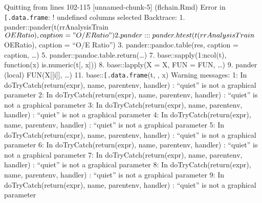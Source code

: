 \documentclass[
]{article}
\newenvironment{Shaded}{\begin{snugshade}}{\end{snugshade}}
\newcommand{\AttributeTok}[1]{\textcolor[rgb]{0.13,0.29,0.53}{#1}}
\newcommand{\FunctionTok}[1]{\textcolor[rgb]{0.13,0.29,0.53}{\textbf{#1}}}
\newcommand{\NormalTok}[1]{#1}
\newcommand{\SpecialCharTok}[1]{\textcolor[rgb]{0.81,0.36,0.00}{\textbf{#1}}}
\newcommand{\StringTok}[1]{\textcolor[rgb]{0.31,0.60,0.02}{#1}}
\begin{document}
Quitting from lines 102-115 {[}unnamed-chunk-5{]} (flchain.Rmd) Error in
\texttt{{[}.data.frame}: ! undefined columns selected Backtrace: 1.
pander::pander(t(rrAnalysisTrain\(OERatio), caption = "O/E Ratio")  2. pander:::pander.htest(t(rrAnalysisTrain\)OERatio),
caption = ``O/E Ratio'') 3. pander::pandoc.table(res, caption = caption,
\ldots) 5. pander::pandoc.table.return(\ldots) 7.
base::sapply(1:ncol(t), function(x) is.numeric(t{[}, x{]})) 8.
base::lapply(X = X, FUN = FUN, \ldots) 9. pander (local)
FUN(X{[}{[}i{]}{]}, \ldots) 11. base::\texttt{{[}.data.frame}(t, , x)
Warning messages: 1: In doTryCatch(return(expr), name, parentenv,
handler) : ``quiet'' is not a graphical parameter 2: In
doTryCatch(return(expr), name, parentenv, handler) : ``quiet'' is not a
graphical parameter 3: In doTryCatch(return(expr), name, parentenv,
handler) : ``quiet'' is not a graphical parameter 4: In
doTryCatch(return(expr), name, parentenv, handler) : ``quiet'' is not a
graphical parameter 5: In doTryCatch(return(expr), name, parentenv,
handler) : ``quiet'' is not a graphical parameter 6: In
doTryCatch(return(expr), name, parentenv, handler) : ``quiet'' is not a
graphical parameter 7: In doTryCatch(return(expr), name, parentenv,
handler) : ``quiet'' is not a graphical parameter 8: In
doTryCatch(return(expr), name, parentenv, handler) : ``quiet'' is not a
graphical parameter 9: In doTryCatch(return(expr), name, parentenv,
handler) : ``quiet'' is not a graphical parameter

\begin{Shaded}
\end{Shaded}
\end{document}
